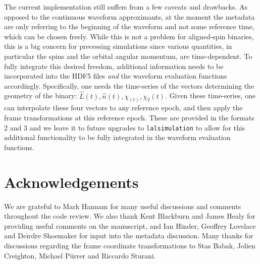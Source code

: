\documentclass[11pt,tightenlines,article,amssymb,amsmath,amsfonts,superscriptaddress,nofootinbib]{revtex4}
\newcommand{\nNR}{\hat{n}}
\newcommand{\lNR}{\hat L}
\begin{document}
The current implementation still suffers from a few caveats and drawbacks. As opposed to the continuous waveform approximants, at the moment the metadata are only referring to the beginning of the waveform and not some reference time, which can be chosen freely. While this is not a problem for aligned-spin binaries, this is a big concern for precessing simulations since various quantities, in particular the spins and the orbital angular momentum, are time-dependent. To fully integrate this desired freedom, additional information needs to be incorporated into the HDF5 files \emph{and} the waveform evaluation functions accordingly. Specifically, one needs the time-series of the vectors determining the geometry of the binary: $\lNR(t), \nNR(t), \chi_(t), \chi_2(t)$. Given these time-series, one can interpolate these four vectors to any reference epoch, and then apply the frame transformations at this reference epoch. These are provided in the formats 2 and 3 and we leave it to future upgrades to \texttt{lalsimulation} to allow for this additional functionality to be fully integrated in the waveform evaluation functions.

\section*{Acknowledgements}
We are grateful to Mark Hannam for many useful discussions and comments throughout the code review.
We also thank Kent Blackburn and James Healy for providing useful comments on the manuscript, and Ian Hinder, Geoffrey Lovelace and Deirdre Shoemaker for input into the metadata discussion.
Many thanks for discussions regarding the frame coordinate transformations to Stas Babak, Jolien Creighton, Michael P\"urrer and Riccardo Sturani.




\end{document}
